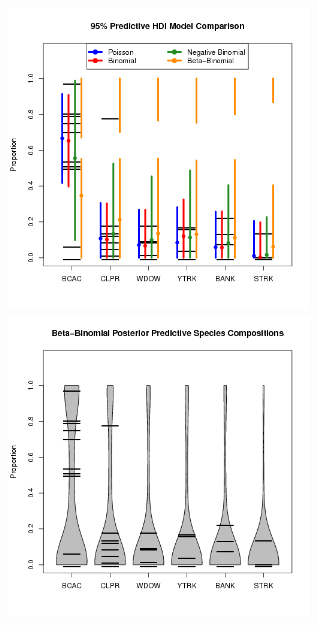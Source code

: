 \documentclass[ xcolor = pdftex, dvipsnames, table ]{beamer}
\begin{document}
\begin{frame}
\hspace*{-1.05cm}
\includegraphics[width=0.6\textwidth]{../pictures/compPlot1982Qtr2.png}
\includegraphics[width=0.6\textwidth]{../pictures/compVioplotQtr2.png}
\end{frame}

\end{document}
